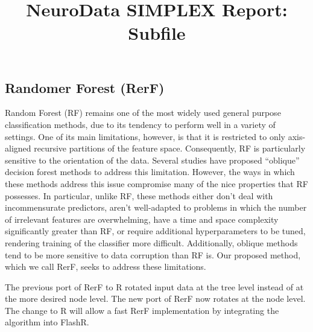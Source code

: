 \documentclass[simplex.tex]{subfiles}
\title{NeuroData SIMPLEX Report: Subfile}
\begin{document}

\subsection{Randomer Forest (RerF)}
Random Forest (RF) remains one of the most widely used general purpose
classification methods, due to its tendency to perform well in a variety of
settings. One of its main limitations, however, is that it is restricted to
only axis-aligned recursive partitions of the feature space. Consequently, RF
is particularly sensitive to the orientation of the data. Several studies have
proposed “oblique” decision forest methods to address this limitation. However,
the ways in which these methods address this issue compromise many of the nice
properties that RF possesses. In particular, unlike RF, these methods either
don’t deal with incommensurate predictors, aren’t well-adapted to problems in
which the number of irrelevant features are overwhelming, have a time and space
complexity significantly greater than RF, or require additional hyperparameters
to be tuned, rendering training of the classifier more difficult. Additionally,
oblique methods tend to be more sensitive to data corruption than RF is. Our
proposed method, which we call RerF, seeks to address these limitations. 	

The previous port of RerF to R rotated input data at the tree level instead 
of at the more desired node level.  The new port of RerF now rotates at the
node level.  The change to R will allow a fast RerF implementation by 
integrating the algorithm into FlashR.
\end{document}
